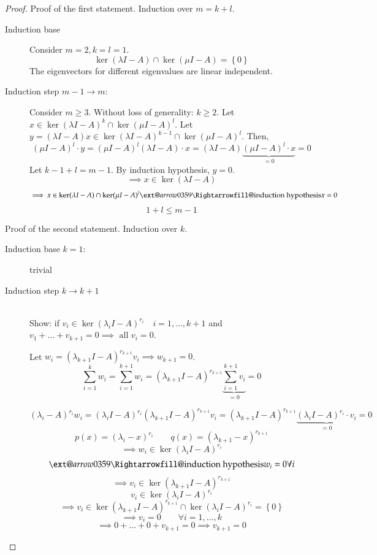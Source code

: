 \documentclass[a4paper]{article}
\makeatletter
\numberwithin{lecref}{section}
\newcommand{\set}[1]{\left\{#1\right\}}
\newcommand{\xRightarrow}[2][]{\ext@arrow 0359\Rightarrowfill@{#1}{#2}}
\makeatother
\begin{document}
\begin{proof}
  Proof of the first statement. Induction over $m = k + l$.
  \begin{description}
    \item[Induction base] 
      Consider $m = 2, k = l = 1$.
      \[ \ker(\lambda I - A) \cap \ker(\mu I - A) = \set{0} \]
      The eigenvectors for different eigenvalues are linear independent.
    \item[Induction step $m-1 \to m$:]
      Consider $m \geq 3$. Without loss of generality: $k \geq 2$.
      Let $x \in \ker(\lambda I - A)^k \cap \ker(\mu I - A)^l$.
      Let $y = (\lambda I - A)x \in \ker(\lambda I - A)^{k-1} \cap \ker(\mu I - A)^l$. Then,
      \[ (\mu I - A)^l \cdot y = (\mu I - A)^l (\lambda I - A) \cdot x = (\lambda I - A) \underbrace{(\mu I - A)^l \cdot x}_{=0} = 0 \]
      Let $k - 1 + l = m - 1$.
      By induction hypothesis, $y = 0$.
      \[ \implies x \in \ker(\lambda I - A) \]
      \[ \implies x \in \ker(\lambda I - A) \cap \ker(\mu I - A)^l \xRightarrow{\text{induction hypothesis}} x = 0 \]
      \[ 1 + l \leq m - 1 \]
  \end{description}

  Proof of the second statement. Induction over $k$.
  \begin{description}
    \item[Induction base $k = 1$:] trivial
    \item[Induction step $k \to k+1$] \hfill{} \\
      Show: if $v_i \in \ker(\lambda_i I - A)^{r_i} \quad i = 1, \dots, k+1$ and $v_1 + \dots + v_{k+1} = 0
      \implies \text{ all } v_i = 0$.

      Let $w_i = (\lambda_{k+1} I - A)^{r_{k+1}} v_i \implies w_{k+1} = 0$.
      \[ \sum_{i=1}^k w_i = \sum_{i=1}^{k+1} w_i = (\lambda_{k+1} I - A)^{r_{k+1}} \underbrace{\sum_{i=1}^{k+1} v_i}_{=0} = 0 \]

      \[ (\lambda_i - A)^{r_i} w_i = (\lambda_i I - A)^{r_i} (\lambda_{k+1} I - A)^{r_{k+1}} v_i = (\lambda_{k+1} I - A)^{r_{k+1}} \underbrace{(\lambda_i I - A)^{r_i} \cdot v_i}_{=0} = 0 \]
      \[ p(x) = (\lambda_i - x)^{r_i} \qquad q(x) = (\lambda_{k+1} - x)^{r_{k+1}} \]
      \[ \implies w_i \in \ker(\lambda_i I - A)^{r_i} \]
      \[ \xRightarrow{\text{induction hypothesis}} w_i = 0 \forall i \]
      \[ \implies v_i \in \ker(\lambda_{k+1} I - A)^{r_{k+1}} \]
      \[ v_i \in \ker(\lambda_i I - A)^{r_i} \]
      \[ \implies v_i \in \ker(\lambda_{k+1} I - A)^{r_{k+1}} \cap \ker(\lambda_i I - A)^{r_i} = \set{0} \]
      \[ \implies v_i = 0 \qquad \forall i = 1, \dots, k \]
      \[ \implies 0 + \dots + 0 + v_{k+1} = 0 \implies v_{k+1} = 0 \]
  \end{description}
\end{proof}
\end{document}
